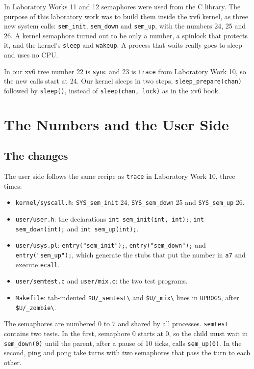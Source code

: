\documentclass[12pt,a4paper]{article}
\begin{document}
In Laboratory Works 11 and 12 semaphores were used from the C library. The purpose of this laboratory work was to build them inside the xv6 kernel, as three new system calls: \texttt{sem\_init}, \texttt{sem\_down} and \texttt{sem\_up}, with the numbers 24, 25 and 26. A kernel semaphore turned out to be only a number, a spinlock that protects it, and the kernel's \texttt{sleep} and \texttt{wakeup}. A process that waits really goes to sleep and uses no CPU.

In our xv6 tree number 22 is \texttt{sync} and 23 is \texttt{trace} from Laboratory Work 10, so the new calls start at 24. Our kernel sleeps in two steps, \texttt{sleep\_prepare(chan)} followed by \texttt{sleep()}, instead of \texttt{sleep(chan, lock)} as in the xv6 book.

\newpage
\section{The Numbers and the User Side}

\subsection{The changes}

The user side follows the same recipe as \texttt{trace} in Laboratory Work 10, three times:

\begin{itemize}
  \item \texttt{kernel/syscall.h}: \texttt{SYS\_sem\_init} 24, \texttt{SYS\_sem\_down} 25 and \texttt{SYS\_sem\_up} 26.
  \item \texttt{user/user.h}: the declarations \texttt{int sem\_init(int, int);}, \texttt{int sem\_down(int);} and \texttt{int sem\_up(int);}.
  \item \texttt{user/usys.pl}: \texttt{entry("sem\_init");}, \texttt{entry("sem\_down");} and \texttt{entry("sem\_up");}, which generate the stubs that put the number in \texttt{a7} and execute \texttt{ecall}.
  \item \texttt{user/semtest.c} and \texttt{user/mix.c}: the two test programs.
  \item \texttt{Makefile}: tab-indented \texttt{\$U/\_semtest\textbackslash} and \texttt{\$U/\_mix\textbackslash} lines in \texttt{UPROGS}, after \texttt{\$U/\_zombie\textbackslash}.
\end{itemize}

The semaphores are numbered 0 to 7 and shared by all processes. \texttt{semtest} contains two tests. In the first, semaphore 0 starts at 0, so the child must wait in \texttt{sem\_down(0)} until the parent, after a pause of 10 ticks, calls \texttt{sem\_up(0)}. In the second, ping and pong take turns with two semaphores that pass the turn to each other.
\end{document}
